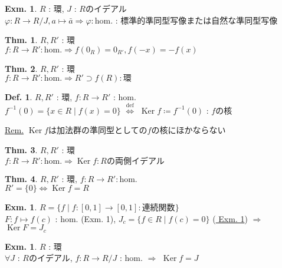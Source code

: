 \documentclass[uplatex,dvipdfmx,9pt]{beamer}
\newcommand{\defarrow}{\overset{\mathrm{def}}{\Leftrightarrow}}
\newcommand{\inverse}[1]{#1^{-1}}
\newcommand{\Ker}{\operatorname{Ker}}
\newcounter{textExmCount}
\theoremstyle{definition} %
\newtheorem{defn}{Def.}[subsection] %
\newtheorem{thm}{Thm.}[subsection] %
\theoremstyle{example}
\newtheorem{exmText}[textExmCount]{Exm.}
\begin{document}
    \begin{frame}

      \begin{exmText}
        $R$ : 環, $J$ : $R$のイデアル \\
        $\varphi \colon R \to R/J, a \mapsto \bar{a} \Rightarrow \varphi : \text{hom.}$ : \alert{標準的準同型写像}または\alert{自然な準同型写像}
      \end{exmText}

      \begin{thm}
        $R, R'$ : 環 \\
        $f\colon R \to R' : \text{hom.} \Rightarrow f(0_R) = 0_{R'}, f(-x) = -f(x)$
      \end{thm}

      \begin{thm}
        $R, R'$ : 環 \\
        $f\colon R \to R' : \text{hom.} \Rightarrow R' \supset f(R) : \text{環}$
      \end{thm}
      
    \end{frame}

    \begin{frame}
      
      \begin{defn}
        $R, R'$ : 環, $f\colon R \to R'$ : hom. \\
        $\inverse{f}(0) = \{x \in R \mid f(x) = 0\}$ $\defarrow$ $\Ker f \coloneqq \inverse{f}(0)$ : $f$の\alert{核}
      \end{defn}
      \underline{Rem.} $\Ker f$は加法群の準同型としての$f$の核にほかならない

      \begin{thm}
        $R, R'$ : 環 \\
        $f\colon R \to R' : \text{hom.} \Rightarrow \Ker f : \text{$R$の両側イデアル}$
      \end{thm}

      \begin{thm}
        $R, R'$ : 環, $f\colon R \to R' : \text{hom.}$ \\
        $R'= \{0\} \Leftrightarrow \Ker f = R$
      \end{thm}

    \end{frame}

    \begin{frame}

      \begin{exmText}
        $R = \{f \mid f\colon [0, 1] \to [0, 1] : \text{連続関数}\}$ \\
        $F\colon f \mapsto f(c)$ : hom. (Exm. 1), $J_c = \{f \in R \mid f(c) = 0\}$ (\hyperlink{exmText3-1}{ Exm. 1}) $\Rightarrow$ $\Ker F = J_c$
      \end{exmText}

      \begin{exmText}
        $R$ : 環 \\
        $\forall J$ : $R$のイデアル, $f\colon R \to R/J$ : hom. $\Rightarrow$ $\Ker f = J$
      \end{exmText}
      
    \end{frame}
\end{document}
